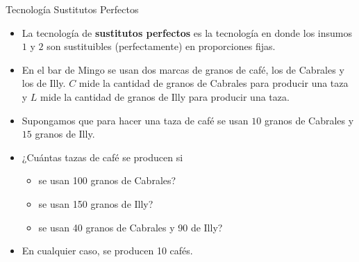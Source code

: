 \documentclass{beamer}
\theoremstyle{definition}
\begin{document}
\begin{frame}{Tecnolog\'ia Sustitutos Perfectos}
	\begin{itemize}
 \item La tecnología de \textbf{sustitutos perfectos} es la tecnología en donde los insumos $1$ y $2$ son sustituibles (perfectamente) en proporciones fijas.
 \item En el bar de Mingo se usan dos marcas de granos de café, los de Cabrales y los de Illy. $C$ mide la cantidad de granos de Cabrales para producir una taza y $L$ mide la cantidad de granos de Illy para producir una taza. 
 \item Supongamos que para hacer una taza de café se usan $10$ granos de Cabrales y $15$ granos de Illy.
 \item ¿Cuántas tazas de café se producen si
 \begin{itemize}
     \item se usan 100 granos de Cabrales?
     \item se usan 150 granos de Illy?
     \item se usan 40 granos de Cabrales y 90 de Illy?
 \end{itemize}
\item En cualquier caso, se producen 10 cafés.
\end{itemize}
\end{frame}
\end{document}

